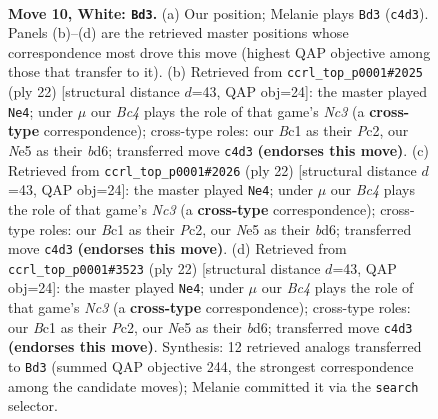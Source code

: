 \documentclass[11pt]{article}
\begin{document}
\clearpage

\begin{figure}[p]\centering
\begin{subfigure}{0.46\textwidth}\centering
\resizebox{\linewidth}{!}{%
\newchessgame
\chessboard[
  setfen={r1bqkb1r/pp3ppp/2p1p3/3nN3/2BP4/4P3/PP3PPP/R1BQK2R w KQkq - 0 10},
  showmover=false,
  pgfstyle=straightmove, color=movearrow, markmove={c4-d3}
]}
\caption{}
\end{subfigure}\hfill
\begin{subfigure}{0.46\textwidth}\centering
\resizebox{\linewidth}{!}{%
\newchessgame
\chessboard[
  setfen={r1bqk2r/5pp1/p1pbp2p/3n4/6P1/2N4P/PPP2PB1/R1BQK2R w KQkq - 0 12},
  showmover=false,
  pgfstyle=straightmove, color=movearrow, markmove={c3-e4}
]}
\caption{}
\end{subfigure}
\\[4pt]
\begin{subfigure}{0.46\textwidth}\centering
\resizebox{\linewidth}{!}{%
\newchessgame
\chessboard[
  setfen={r1bqk2r/5pp1/p1pbp2p/3n4/6P1/2N4P/PPP2PB1/R1BQK2R w KQkq - 0 12},
  showmover=false,
  pgfstyle=straightmove, color=movearrow, markmove={c3-e4}
]}
\caption{}
\end{subfigure}\hfill
\begin{subfigure}{0.46\textwidth}\centering
\resizebox{\linewidth}{!}{%
\newchessgame
\chessboard[
  setfen={r1bqk2r/5pp1/p1pbp2p/3n4/6P1/2N4P/PPP2PB1/R1BQK2R w KQkq - 0 12},
  showmover=false,
  pgfstyle=straightmove, color=movearrow, markmove={c3-e4}
]}
\caption{}
\end{subfigure}
\caption{\textbf{Move 10, White: \texttt{Bd3}.} (a) Our position; Melanie plays \texttt{Bd3} (\texttt{c4d3}). Panels (b)--(d) are the retrieved master positions whose correspondence most drove this move (highest QAP objective among those that transfer to it). (b) Retrieved from \texttt{ccrl\_top\_p0001\#2025} (ply 22) [structural distance $d$=43, QAP obj=24]: the master played \texttt{Ne4}; under $\mu$ our \emph{Bc4} plays the role of that game's \emph{Nc3} (a \textbf{cross-type} correspondence); cross-type roles: our \emph{B}c1 as their \emph{P}c2, our \emph{N}e5 as their \emph{b}d6; transferred move \texttt{c4d3} \textbf{(endorses this move)}. (c) Retrieved from \texttt{ccrl\_top\_p0001\#2026} (ply 22) [structural distance $d$=43, QAP obj=24]: the master played \texttt{Ne4}; under $\mu$ our \emph{Bc4} plays the role of that game's \emph{Nc3} (a \textbf{cross-type} correspondence); cross-type roles: our \emph{B}c1 as their \emph{P}c2, our \emph{N}e5 as their \emph{b}d6; transferred move \texttt{c4d3} \textbf{(endorses this move)}. (d) Retrieved from \texttt{ccrl\_top\_p0001\#3523} (ply 22) [structural distance $d$=43, QAP obj=24]: the master played \texttt{Ne4}; under $\mu$ our \emph{Bc4} plays the role of that game's \emph{Nc3} (a \textbf{cross-type} correspondence); cross-type roles: our \emph{B}c1 as their \emph{P}c2, our \emph{N}e5 as their \emph{b}d6; transferred move \texttt{c4d3} \textbf{(endorses this move)}. Synthesis: 12 retrieved analogs transferred to \texttt{Bd3} (summed QAP objective 244, the strongest correspondence among the candidate moves); Melanie committed it via the \texttt{search} selector.}
\label{fig:thought-m18}
\end{figure}
\end{document}
